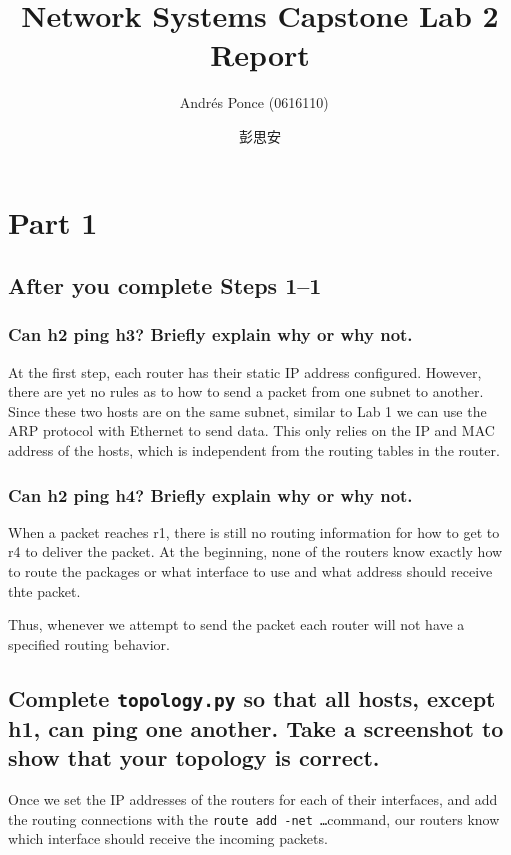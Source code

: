 \documentclass{article}
\author{Andr\'es Ponce (0616110) \
\and
彭思安}
\title{Network Systems Capstone Lab 2 Report}
\begin{document}
\maketitle
\section{Part 1}
\subsection{After you complete Steps 1--1}
\subsubsection{Can h2 ping h3? Briefly explain why or why not.}
At the first step, each router has their static IP address configured.
However, there are yet no rules as to how to send a packet from one subnet
to another.
Since these two hosts are on the same subnet, similar to Lab 1 we can use the 
ARP protocol with Ethernet to send data. 
This only relies on the IP and MAC address of the hosts, which is independent 
from the routing tables in the router.

\subsubsection{Can h2 ping h4? Briefly explain why or why not.}
When a packet reaches r1, there is still no routing information for how to get to 
r4 to deliver the packet.
At the beginning, none of the routers know exactly how to route the packages
or what interface to use and what address should receive thte packet.

Thus, whenever we attempt to send the packet each router will not have a specified
routing behavior.
\subsection{Complete \texttt{topology.py} so that all hosts, except h1, can ping one 
another. Take a screenshot to show that your topology is correct.}
Once we set the IP addresses of the routers for each of their interfaces, and add
the routing connections with the \texttt{route add -net \dots}command, our routers
know which interface should receive the incoming packets.
\end{document}
